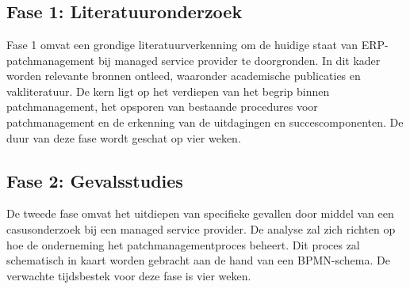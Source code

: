 
\chapter{}%
\label{ch:methodologie}


\section{Fase 1: Literatuuronderzoek}
Fase 1 omvat een grondige literatuurverkenning om de huidige staat van ERP-patchmanagement bij managed service provider te doorgronden. In dit kader worden relevante bronnen ontleed, waaronder academische publicaties en vakliteratuur. De kern ligt op het verdiepen van het begrip binnen patchmanagement, het opsporen van bestaande procedures voor patchmanagement en de erkenning van de uitdagingen en succescomponenten. De duur van deze fase wordt geschat op vier weken.
\section{Fase 2: Gevalsstudies}
De tweede fase omvat het uitdiepen van specifieke gevallen door middel van een casusonderzoek bij een managed service provider. De analyse zal zich richten op hoe de onderneming het patchmanagementproces beheert. Dit proces zal schematisch in kaart worden gebracht aan de hand van een BPMN-schema. De verwachte tijdsbestek voor deze fase is vier weken.
